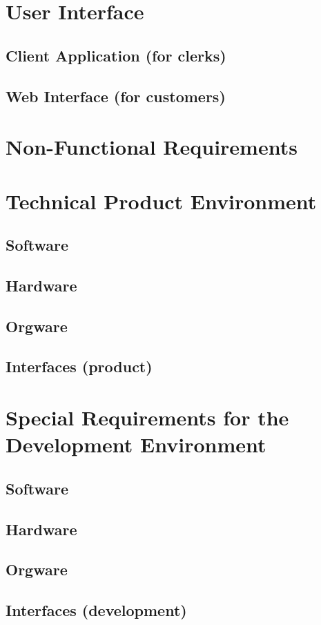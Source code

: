 \documentclass[11pt,a4paper,oneside,svgnames]{report}
\begin{document}
\chapter{User Interface}
\section{Client Application (for clerks)}
\section{Web Interface (for customers)}

\chapter{Non-Functional Requirements}
\chapter{Technical Product Environment}
\section{Software}
\section{Hardware}
\section{Orgware}
\section{Interfaces (product)}

\chapter{Special Requirements for the Development Environment}
\section{Software}
\section{Hardware}
\section{Orgware}
\section{Interfaces (development)}
\end{document}
